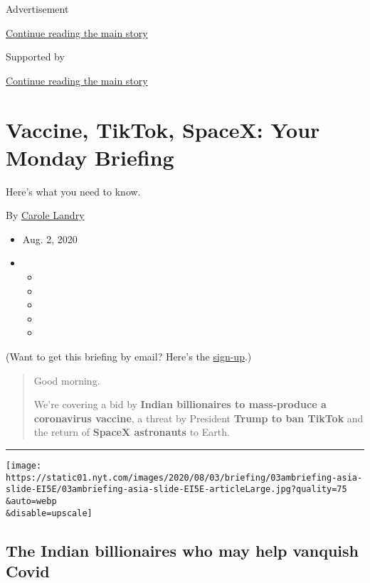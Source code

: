Advertisement

\protect\hyperlink{after-top}{Continue reading the main story}

Supported by

\protect\hyperlink{after-sponsor}{Continue reading the main story}

\hypertarget{vaccine-tiktok-spacex-your-monday-briefing}{%
\section{Vaccine, TikTok, SpaceX: Your Monday
Briefing}\label{vaccine-tiktok-spacex-your-monday-briefing}}

Here's what you need to know.

By \href{https://www.nytimes.com/by/carole-landry}{Carole Landry}

\begin{itemize}
\item
  Aug. 2, 2020
\item
  \begin{itemize}
  \item
  \item
  \item
  \item
  \item
  \end{itemize}
\end{itemize}

(Want to get this briefing by email? Here's the
\href{https://www.nytimes.com/morning-briefing}{sign-up}.)

\begin{quote}
Good morning.

We're covering a bid by \textbf{Indian billionaires to mass-produce a
coronavirus vaccine}, a threat by President \textbf{Trump to ban TikTok}
and the return of \textbf{SpaceX astronauts} to Earth.
\end{quote}

\begin{center}\rule{0.5\linewidth}{\linethickness}\end{center}

\texttt{[image: https://static01.nyt.com/images/2020/08/03/briefing/03ambriefing-asia-slide-EI5E/03ambriefing-asia-slide-EI5E-articleLarge.jpg?quality=75\\\&auto=webp\\\&disable=upscale]}

\hypertarget{the-indian-billionaires-who-may-help-vanquish-covid}{%
\subsection{The Indian billionaires who may help vanquish
Covid}\label{the-indian-billionaires-who-may-help-vanquish-covid}}

